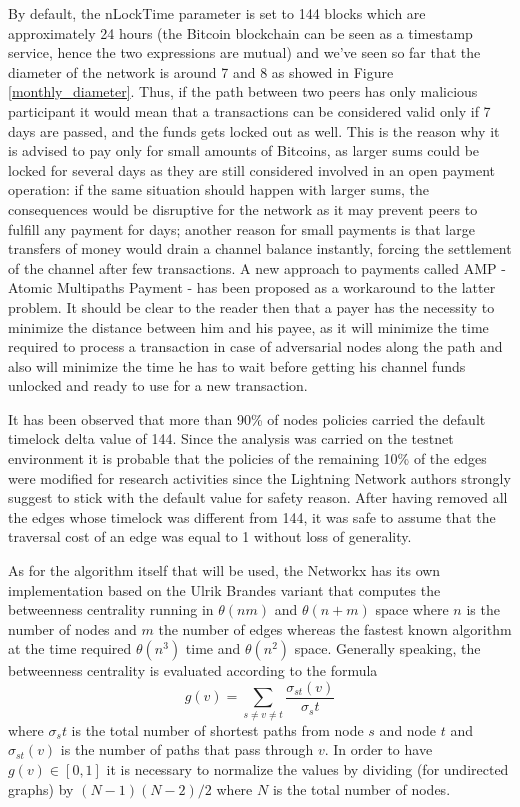	By default, the nLockTime parameter is set to 144 blocks which are approximately 24 hours (the Bitcoin blockchain can be seen as a timestamp service, hence the two expressions are mutual) and we've seen so far that the diameter of the network is around 7 and 8 as showed in Figure \ref{monthly_diameter}. Thus, if the path between two peers has only malicious participant it would mean that a transactions can be considered valid only if 7 days are passed, and the funds gets locked out as well. This is the reason why it is advised to pay only for small amounts of Bitcoins, as larger sums could be locked for several days as they are still considered involved in an open payment operation: if the same situation should happen with larger sums, the consequences would be disruptive for the network as it may prevent peers to fulfill any payment for days; another reason for small payments is that large transfers of money would drain a channel balance instantly, forcing the settlement of the channel after few transactions. A new approach to payments called AMP \cite{Amp2018} - Atomic Multipaths Payment - has been proposed as a workaround to the latter problem. It should be clear to the reader then that a payer has the necessity to minimize the distance between him and his payee, as it will minimize the time required to process a transaction in case of adversarial nodes along the path and also will minimize the time he has to wait before getting his channel funds unlocked and ready to use for a new transaction.
	
	It has been observed that more than 90\% of nodes policies carried the default timelock delta value of 144. Since the analysis was carried on the testnet environment it is probable that the policies of the remaining 10\% of the edges were modified for research activities since the Lightning Network authors strongly suggest to stick with the default value for safety reason. After having removed all the edges whose timelock was different from 144, it was safe to assume that the traversal cost of an edge was equal to 1 without loss of generality.
	
	As for the algorithm itself that will be used, the Networkx has its own implementation based on the Ulrik Brandes \cite{Brandes2001} variant that computes the betweenness centrality running in $\theta(nm)$ and $\theta(n + m)$ space where $n$ is the number of nodes and $m$ the number of edges whereas the fastest known algorithm at the time required $\theta(n^3)$ time and $\theta(n^2)$ space.	Generally speaking, the betweenness centrality is evaluated according to the formula 
	\begin{equation}
		g(v) = \sum_{s \neq v \neq t}{\frac{\sigma_{st}(v) }{\sigma_st}}
	\end{equation}
	where $\sigma_st$ is the total number of shortest paths from node $s$ and node $t$ and $\sigma_{st}(v)$ is the number of paths that pass through $v$. In order to have $g(v) \in [0, 1]$ it is necessary to normalize the values by dividing (for undirected graphs) by $(N-1)(N-2)/2$ where $N$ is the total number of nodes.

